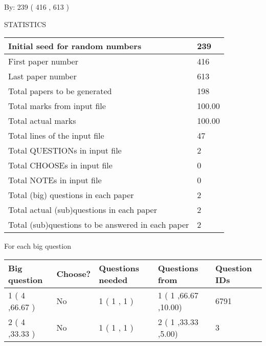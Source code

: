 \documentclass[12pt]{article}
\begin{document}
   
\hspace{1.0in} By: 
 239 ( 416 ,  613 )
   
   
   
\vspace{0.2in}
\vspace{0.2in}
   
   
 \newpage
\setcounter{page}{1} 
   
   
 {\LARGE{STATISTICS}}
   
\vspace{0.2in}
   
 \begin{tabular}{|l|l|}
 \hline
 Initial seed for random numbers & 239  \\
\hline
 First paper number & 416  \\
\hline
 Last  paper number & 613  \\
\hline
 Total papers to be generated & 198  \\
\hline
Total marks from input file & 100.00 \\
\hline
Total actual marks & 100.00 \\
\hline
 Total lines of the input file & 47  \\
 \hline
 Total QUESTIONs in input file & 2  \\
\hline
 Total CHOOSEs in input file & 0  \\
\hline
 Total NOTEs in input file & 0  \\
\hline
 Total (big) questions in each paper & 2  \\
\hline
 Total actual (sub)questions in each paper & 2  \\
\hline
 Total (sub)questions to be answered in each paper & 2  \\
\hline
 \end{tabular}
   
   
 \newpage
   
{\LARGE{For each big question}}
   
   
\vspace{0.2in}
   
   
\noindent\hspace{-0.4in}\begin{tabular}{|l|l|l|l|l|}
\hline
 Big question & Choose? & Questions needed & Questions from & Question IDs \\ 
\hline
 1 ( 4 ,66.67
 ) &  No   & 
 1 ( 1 ,  1 ) &  1 ( 1
,66.67
 ,10.00) &  6791  \\
 \hline
 2 ( 4 ,33.33
 ) &  No   & 
 1 ( 1 ,  1 ) &  2 ( 1
,33.33
 ,5.00) &  3  \\
 \hline
 \end{tabular}
 
 
\end{document}
